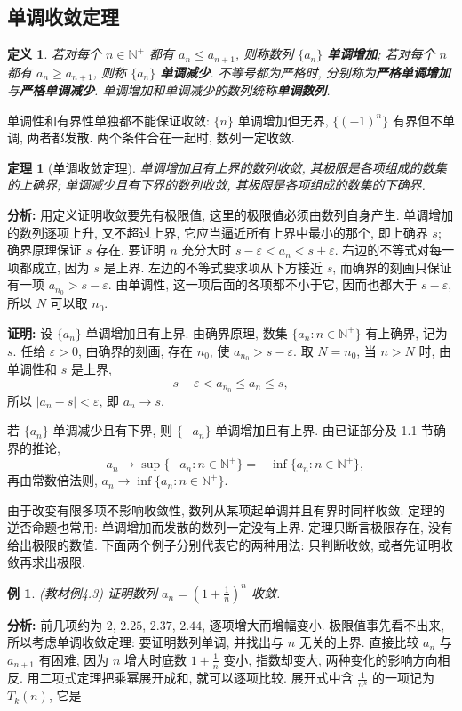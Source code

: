 \documentclass[UTF8,openany]{ctexbook}
\theoremstyle{chinesetextbook}
\newtheorem{definition}{定义}[section]
\newtheorem{example}{例}[section]
\newtheorem{theorem}{定理}[section]
\newenvironment{cnproof}{\par\indent\textbf{证明:} \ignorespaces}{\par}
\begin{document}
\subsection{单调收敛定理}
\begin{definition}
若对每个 $n\in\mathbb N^+$ 都有 $a_n\le a_{n+1}$, 则称数列 $\{a_n\}$ \textbf{单调增加}; 若对每个 $n$ 都有 $a_n\ge a_{n+1}$, 则称 $\{a_n\}$ \textbf{单调减少}. 不等号都为严格时, 分别称为\textbf{严格单调增加}与\textbf{严格单调减少}. 单调增加和单调减少的数列统称\textbf{单调数列}.
\end{definition}
单调性和有界性单独都不能保证收敛: $\{n\}$ 单调增加但无界, $\{(-1)^n\}$ 有界但不单调, 两者都发散. 两个条件合在一起时, 数列一定收敛.
\begin{theorem}[单调收敛定理]
单调增加且有上界的数列收敛, 其极限是各项组成的数集的上确界; 单调减少且有下界的数列收敛, 其极限是各项组成的数集的下确界.
\end{theorem}
\par\indent\textbf{分析:} 用定义证明收敛要先有极限值, 这里的极限值必须由数列自身产生. 单调增加的数列逐项上升, 又不超过上界, 它应当逼近所有上界中最小的那个, 即上确界 $s$; 确界原理保证 $s$ 存在. 要证明 $n$ 充分大时 $s-\varepsilon<a_n<s+\varepsilon$. 右边的不等式对每一项都成立, 因为 $s$ 是上界. 左边的不等式要求项从下方接近 $s$, 而确界的刻画只保证有一项 $a_{n_0}>s-\varepsilon$. 由单调性, 这一项后面的各项都不小于它, 因而也都大于 $s-\varepsilon$, 所以 $N$ 可以取 $n_0$.
\begin{cnproof}
设 $\{a_n\}$ 单调增加且有上界. 由确界原理, 数集 $\{a_n:n\in\mathbb N^+\}$ 有上确界, 记为 $s$. 任给 $\varepsilon>0$, 由确界的刻画, 存在 $n_0$, 使 $a_{n_0}>s-\varepsilon$. 取 $N=n_0$, 当 $n>N$ 时, 由单调性和 $s$ 是上界,
\[
s-\varepsilon<a_{n_0}\le a_n\le s,
\]
所以 $|a_n-s|<\varepsilon$, 即 $a_n\to s$.

若 $\{a_n\}$ 单调减少且有下界, 则 $\{-a_n\}$ 单调增加且有上界. 由已证部分及 1.1 节确界的推论,
\[
-a_n\to\sup\{-a_n:n\in\mathbb N^+\}=-\inf\{a_n:n\in\mathbb N^+\},
\]
再由常数倍法则, $a_n\to\inf\{a_n:n\in\mathbb N^+\}$.
\end{cnproof}
由于改变有限多项不影响收敛性, 数列从某项起单调并且有界时同样收敛. 定理的逆否命题也常用: 单调增加而发散的数列一定没有上界. 定理只断言极限存在, 没有给出极限的数值. 下面两个例子分别代表它的两种用法: 只判断收敛, 或者先证明收敛再求出极限.
\begin{example}
\textnormal{(教材例4.3)} 证明数列 $\displaystyle a_n=\left(1+\frac1n\right)^n$ 收敛.
\end{example}
\par\indent\textbf{分析:} 前几项约为 $2$, $2.25$, $2.37$, $2.44$, 逐项增大而增幅变小. 极限值事先看不出来, 所以考虑单调收敛定理: 要证明数列单调, 并找出与 $n$ 无关的上界. 直接比较 $a_n$ 与 $a_{n+1}$ 有困难, 因为 $n$ 增大时底数 $\displaystyle1+\frac1n$ 变小, 指数却变大, 两种变化的影响方向相反. 用二项式定理把乘幂展开成和, 就可以逐项比较. 展开式中含 $\displaystyle\frac1{n^k}$ 的一项记为 $T_k(n)$, 它是
\end{document}
